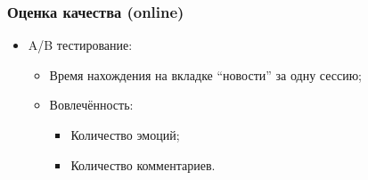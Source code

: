 \documentclass[xetex,mathserif,serif]{beamer}
\begin{document}
\begin{frame}
	\frametitle{Оценка качества (online)}

    \begin{table}[]
    \centering
    \caption{Online evaluation}
    \label{tab:eval}
    \end{table}

	\begin{itemize}
		\item A/B тестирование:
            \begin{itemize}
                \item Время нахождения на вкладке ``новости'' за одну сессию;
                \item Вовлечённость:
                    \begin{itemize}
                        \item Количество эмоций;
                        \item Количество комментариев.
                    \end{itemize}
            \end{itemize}
	\end{itemize}
\end{frame}
\end{document}
